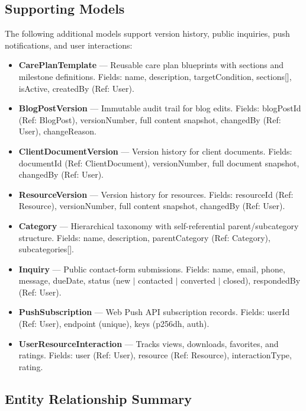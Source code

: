 \documentclass[12pt,letterpaper]{article}
\begin{document}
\subsection{Supporting Models}

The following additional models support version history, public inquiries, push notifications, and user interactions:

\begin{itemize}[nosep]
  \item \textbf{CarePlanTemplate} --- Reusable care plan blueprints with sections and milestone definitions. Fields: name, description, targetCondition, sections[], isActive, createdBy (Ref: User).
  \item \textbf{BlogPostVersion} --- Immutable audit trail for blog edits. Fields: blogPostId (Ref: BlogPost), versionNumber, full content snapshot, changedBy (Ref: User), changeReason.
  \item \textbf{ClientDocumentVersion} --- Version history for client documents. Fields: documentId (Ref: ClientDocument), versionNumber, full document snapshot, changedBy (Ref: User).
  \item \textbf{ResourceVersion} --- Version history for resources. Fields: resourceId (Ref: Resource), versionNumber, full content snapshot, changedBy (Ref: User).
  \item \textbf{Category} --- Hierarchical taxonomy with self-referential parent/subcategory structure. Fields: name, description, parentCategory (Ref: Category), subcategories[].
  \item \textbf{Inquiry} --- Public contact-form submissions. Fields: name, email, phone, message, dueDate, status (new $\vert$ contacted $\vert$ converted $\vert$ closed), respondedBy (Ref: User).
  \item \textbf{PushSubscription} --- Web Push API subscription records. Fields: userId (Ref: User), endpoint (unique), keys (p256dh, auth).
  \item \textbf{UserResourceInteraction} --- Tracks views, downloads, favorites, and ratings. Fields: user (Ref: User), resource (Ref: Resource), interactionType, rating.
\end{itemize}

\subsection{Entity Relationship Summary}
\end{document}
